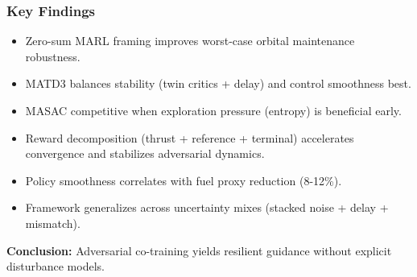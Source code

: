 \begin{frame}
  \frametitle{Key Findings}
  \small
  \begin{itemize}\setlength{\itemsep}{5pt}
    \item Zero-sum MARL framing improves worst-case orbital maintenance robustness.
    \item MATD3 balances stability (twin critics + delay) and control smoothness best.
    \item MASAC competitive when exploration pressure (entropy) is beneficial early.
    \item Reward decomposition (thrust + reference + terminal) accelerates convergence and stabilizes adversarial dynamics.
    \item Policy smoothness correlates with fuel proxy reduction (8-12\%).
    \item Framework generalizes across uncertainty mixes (stacked noise + delay + mismatch).
  \end{itemize}
  \vspace{4pt}
  \textbf{Conclusion:} Adversarial co-training yields resilient guidance without explicit disturbance models.
\end{frame}



